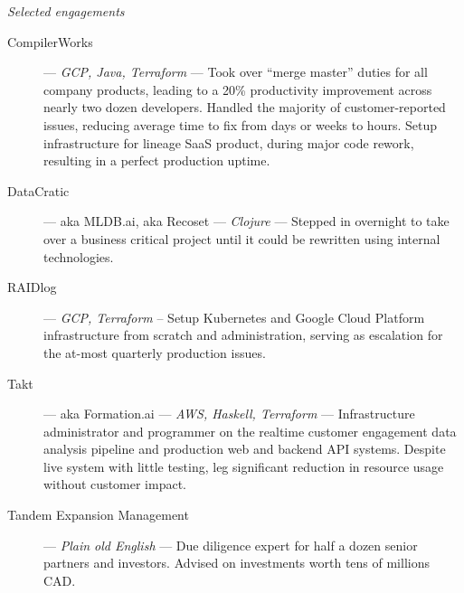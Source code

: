 \textit{\large Selected engagements}
\vspace{1 mm}
\begin{description}
\item[CompilerWorks] --- \textit{GCP, Java, Terraform} --- Took over ``merge master'' duties for all company products, leading to a 20\% productivity improvement across nearly two dozen developers. Handled the majority of customer-reported issues, reducing average time to fix from days or weeks to hours. Setup infrastructure for lineage SaaS product, during major code rework, resulting in a perfect production uptime.
\vspace{1 mm}
\item[DataCratic] --- aka MLDB.ai, aka Recoset --- \textit{Clojure} --- Stepped in overnight to take over a business critical project until it could be rewritten using internal technologies.
\vspace{1 mm}
\item[RAIDlog] --- \textit{GCP, Terraform} -- Setup Kubernetes and Google Cloud Platform infrastructure from scratch and administration, serving as escalation for the at-most quarterly production issues.
\vspace{1 mm}
\item[Takt] --- aka Formation.ai --- \textit{AWS, Haskell, Terraform} --- Infrastructure administrator and programmer on the realtime customer engagement data analysis pipeline and production web and backend API systems. Despite live system with little testing, leg significant reduction in resource usage without customer impact.
\vspace{1 mm}
\item[Tandem Expansion Management] --- \textit{Plain old English} --- Due diligence expert for half a dozen senior partners and investors. Advised on investments worth tens of millions CAD.

\end{description}
